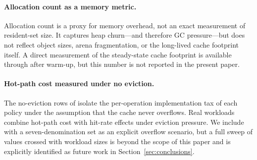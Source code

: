 \paragraph{Allocation count as a memory metric.}
Allocation count is a proxy for memory overhead, not an exact measurement of resident-set size. It captures heap churn---and therefore GC pressure---but does not reflect object sizes, arena fragmentation, or the long-lived cache footprint itself. A direct measurement of the steady-state cache footprint is available through  after warm-up, but this number is not reported in the present paper.

\paragraph{Hot-path cost measured under no eviction.}
The no-eviction rows of  isolate the per-operation implementation tax of each policy under the assumption that the cache never overflows. Real workloads combine hot-path cost with hit-rate effects under eviction pressure. We include  with a seven-denomination set as an explicit overflow scenario, but a full sweep of  values crossed with workload sizes is beyond the scope of this paper and is explicitly identified as future work in Section~\ref{sec:conclusions}.
